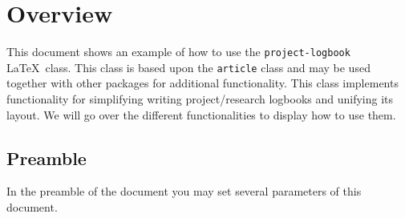 \documentclass{project-logbook}
\begin{document}

\MakeFrontPage




\section{Overview} \label{sec:overview}
	This document shows an example of how to use the \texttt{project-logbook} \LaTeX~class. This class is based upon the \texttt{article} class and may be used together with other packages for additional functionality. This class implements functionality for simplifying writing project/research logbooks and unifying its layout. We will  go over the different functionalities to display how to use them.

	\subsection{Preamble}
		In the preamble of the document you may set several parameters of this document.
\end{document}
